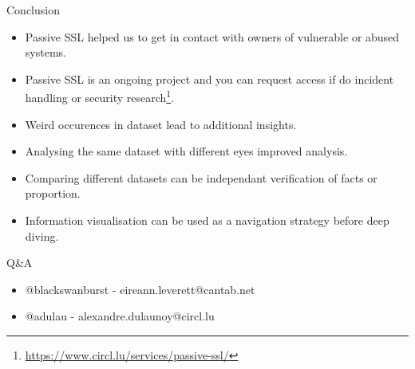 \begin{frame}[t, fragile]{Conclusion}
        \begin{itemize}
                \item Passive SSL helped us to get in contact with owners of vulnerable or abused systems.
                \item Passive SSL is an ongoing project and you can request access if do incident handling or security research\footnote{\url{https://www.circl.lu/services/passive-ssl/}}.
                \item Weird occurences in dataset lead to additional insights.
                \item Analysing the same dataset with different eyes improved analysis.
                \item Comparing different datasets can be independant verification of facts or proportion.
                \item Information visualisation can be used as a navigation strategy before deep diving.
        \end{itemize}
\end{frame}

\begin{frame}[t, fragile]{Q\&A}
        \begin{itemize}
                \item @blackswanburst - eireann.leverett@cantab.net
                \item @adulau - alexandre.dulaunoy@circl.lu
        \end{itemize}

\end{frame}


